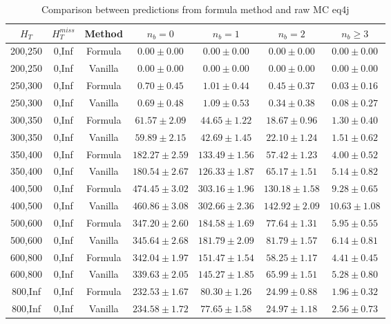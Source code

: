
\begin{longtable}{ | c | c | c | c | c | c | c | }
\caption{Comparison between predictions from formula method and raw MC eq4j} \label{tab:formula-eq4j} \\    \hline 
$H_{T}$ & $H_{T}^{miss}$ & Method & $n_{b} = 0$ & $n_{b} = 1$ & $n_{b} = 2$ & $n_{b} \ge 3$ \\ \hline200,250 & 0,Inf & Formula  & $     0.00 \pm  0.00 $ & $     0.00 \pm  0.00 $ & $     0.00 \pm  0.00 $ & $     0.00 \pm  0.00 $  \\  
200,250 & 0,Inf & Vanilla  & $     0.00 \pm  0.00 $ & $     0.00 \pm  0.00 $ & $     0.00 \pm  0.00 $ & $     0.00 \pm  0.00 $  \\ \hline 
250,300 & 0,Inf & Formula  & $     0.70 \pm  0.45 $ & $     1.01 \pm  0.44 $ & $     0.45 \pm  0.37 $ & $     0.03 \pm  0.16 $  \\  
250,300 & 0,Inf & Vanilla  & $     0.69 \pm  0.48 $ & $     1.09 \pm  0.53 $ & $     0.34 \pm  0.38 $ & $     0.08 \pm  0.27 $  \\ \hline 
300,350 & 0,Inf & Formula  & $    61.57 \pm  2.09 $ & $    44.65 \pm  1.22 $ & $    18.67 \pm  0.96 $ & $     1.30 \pm  0.40 $  \\  
300,350 & 0,Inf & Vanilla  & $    59.89 \pm  2.15 $ & $    42.69 \pm  1.45 $ & $    22.10 \pm  1.24 $ & $     1.51 \pm  0.62 $  \\ \hline 
350,400 & 0,Inf & Formula  & $   182.27 \pm  2.59 $ & $   133.49 \pm  1.56 $ & $    57.42 \pm  1.23 $ & $     4.00 \pm  0.52 $  \\  
350,400 & 0,Inf & Vanilla  & $   180.54 \pm  2.67 $ & $   126.33 \pm  1.87 $ & $    65.17 \pm  1.51 $ & $     5.14 \pm  0.82 $  \\ \hline 
400,500 & 0,Inf & Formula  & $   474.45 \pm  3.02 $ & $   303.16 \pm  1.96 $ & $   130.18 \pm  1.58 $ & $     9.28 \pm  0.65 $  \\  
400,500 & 0,Inf & Vanilla  & $   460.86 \pm  3.08 $ & $   302.66 \pm  2.36 $ & $   142.92 \pm  2.09 $ & $    10.63 \pm  1.08 $  \\ \hline 
500,600 & 0,Inf & Formula  & $   347.20 \pm  2.60 $ & $   184.58 \pm  1.69 $ & $    77.64 \pm  1.31 $ & $     5.95 \pm  0.55 $  \\  
500,600 & 0,Inf & Vanilla  & $   345.64 \pm  2.68 $ & $   181.79 \pm  2.09 $ & $    81.79 \pm  1.57 $ & $     6.14 \pm  0.81 $  \\ \hline 
600,800 & 0,Inf & Formula  & $   342.04 \pm  1.97 $ & $   151.47 \pm  1.54 $ & $    58.25 \pm  1.17 $ & $     4.41 \pm  0.45 $  \\  
600,800 & 0,Inf & Vanilla  & $   339.63 \pm  2.05 $ & $   145.27 \pm  1.85 $ & $    65.99 \pm  1.51 $ & $     5.28 \pm  0.80 $  \\ \hline 
800,Inf & 0,Inf & Formula  & $   232.53 \pm  1.67 $ & $    80.30 \pm  1.26 $ & $    24.99 \pm  0.88 $ & $     1.96 \pm  0.32 $  \\  
800,Inf & 0,Inf & Vanilla  & $   234.58 \pm  1.72 $ & $    77.65 \pm  1.58 $ & $    24.97 \pm  1.18 $ & $     2.56 \pm  0.73 $  \\ \hline 
    \hline 
    \hline 
\end{longtable}